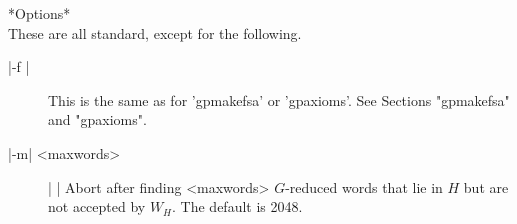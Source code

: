 *Options*\\
These are all standard, except for the following.
\begin{description}
\item[|-f |] This is the same as for 'gpmakefsa' or 'gpaxioms'. See Sections
"gpmakefsa" and "gpaxioms".
\item[|-m| <maxwords>]| |\newline
Abort after finding <maxwords> $G$-reduced words that lie in $H$ but are
not accepted by $W_H$. The default is 2048.
\end{description}
